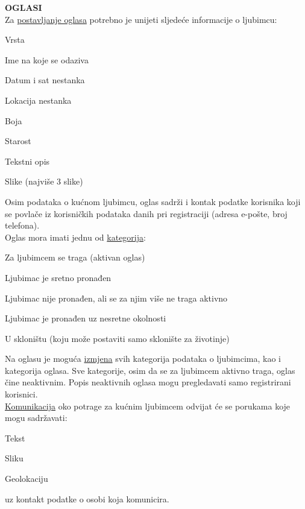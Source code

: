 		\textbf{OGLASI}\\
		Za \underline{postavljanje oglasa} potrebno je unijeti sljedeće informacije o ljubimcu:
		\begin{packed_item}
			\item Vrsta
			\item Ime na koje se odaziva
			\item Datum i sat nestanka
			\item Lokacija nestanka
			\item Boja
			\item Starost
			\item Tekstni opis
			\item Slike (najviše 3 slike)
		\end{packed_item}
		Osim podataka o kućnom ljubimcu, oglas sadrži i kontak podatke korisnika koji se povlače iz korisničkih podataka danih pri registraciji (adresa e-pošte, broj telefona).\\
		Oglas mora imati jednu od \underline{kategorija}:
		\begin{packed_item}
			\item Za ljubimcem se traga (aktivan oglas)
			\item Ljubimac je sretno pronađen
			\item Ljubimac nije pronađen, ali se za njim više ne traga aktivno
			\item Ljubimac je pronađen uz nesretne okolnosti
			\item U skloništu (koju može postaviti samo sklonište za životinje)
		\end{packed_item}
		Na oglasu je moguća \underline{izmjena} svih kategorija podataka o ljubimcima, kao i kategorija oglasa. Sve kategorije, osim da se za ljubimcem aktivno traga, oglas čine neaktivnim. Popis neaktivnih oglasa mogu pregledavati samo registrirani korisnici.\\
		\underline{Komunikacija} oko potrage za kućnim ljubimcem odvijat će se porukama koje mogu sadržavati:
		\begin{packed_item}
			\item Tekst
			\item Sliku
			\item Geolokaciju
		\end{packed_item}
		uz kontakt podatke o osobi koja komunicira.\\
		

